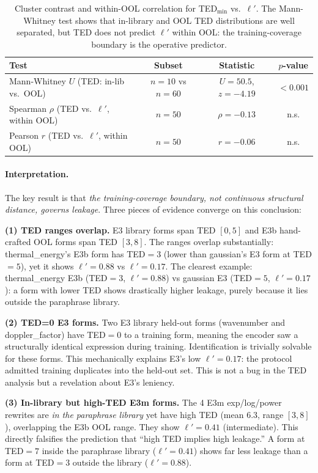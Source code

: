 \begin{table}[h]
\centering
\small
\caption{Cluster contrast and within-OOL correlation for TED$_{\min}$ vs.\ $\ell'$. The Mann-Whitney test shows that in-library and OOL TED distributions are well separated, but TED does not predict $\ell'$ within OOL: the training-coverage boundary is the operative predictor.}
\label{tab:ted_correlation}
\begin{tabular}{lccc}
\toprule
Test & Subset & Statistic & $p$-value \\
\midrule
Mann-Whitney $U$ (TED: in-lib vs.\ OOL) & $n{=}10$ vs $n{=}60$ & $U{=}50.5$, $z{=}{-}4.19$ & $<0.001$ \\
Spearman $\rho$ (TED vs.\ $\ell'$, within OOL) & $n{=}50$ & $\rho{=}{-}0.13$ & n.s. \\
Pearson $r$ (TED vs.\ $\ell'$, within OOL) & $n{=}50$ & $r{=}{-}0.06$ & n.s. \\
\bottomrule
\end{tabular}
\end{table}

\paragraph{Interpretation.} The key result is that \emph{the training-coverage boundary, not continuous structural distance, governs leakage}. Three pieces of evidence converge on this conclusion:

\textbf{(1) TED ranges overlap.} E3 library forms span TED $[0, 5]$ and E3b hand-crafted OOL forms span TED $[3, 8]$. The ranges overlap substantially: thermal\_energy's E3b form has TED$=3$ (lower than gaussian's E3 form at TED$=5$), yet it shows $\ell'{=}0.88$ vs $\ell'{=}0.17$. The clearest example: thermal\_energy E3b (TED$=3$, $\ell'{=}0.88$) vs gaussian E3 (TED$=5$, $\ell'{=}0.17$): a form with lower TED shows drastically higher leakage, purely because it lies outside the paraphrase library.

\textbf{(2) TED=0 E3 forms.} Two E3 library held-out forms (wavenumber and doppler\_factor) have TED$=0$ to a training form, meaning the encoder saw a structurally identical expression during training. Identification is trivially solvable for these forms. This mechanically explains E3's low $\ell'{=}0.17$: the protocol admitted training duplicates into the held-out set. This is not a bug in the TED analysis but a revelation about E3's leniency.

\textbf{(3) In-library but high-TED E3m forms.} The 4 E3m exp/log/power rewrites are \emph{in the paraphrase library} yet have high TED (mean $6.3$, range $[3, 8]$), overlapping the E3b OOL range. They show $\ell'{=}0.41$ (intermediate). This directly falsifies the prediction that ``high TED implies high leakage.'' A form at TED$=7$ inside the paraphrase library ($\ell'{=}0.41$) shows far less leakage than a form at TED$=3$ outside the library ($\ell'{=}0.88$).

